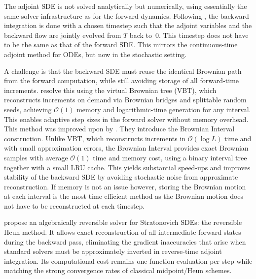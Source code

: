 The adjoint SDE is not solved analytically but numerically, using essentially the same solver infrastructure as for the
forward dynamics. Following \textcite{liScalableGradientsStochastic2020}, the backward integration is done with a chosen
timestep such that the adjoint variables and the backward flow are jointly evolved from $T$ back to~$0$. This timestep
does not have to be the same as that of the forward SDE. This mirrors the continuous-time adjoint method for ODEs, but
now in the stochastic setting.

A challenge is that the backward SDE must reuse the identical Brownian path from the forward computation, while
still avoiding storage of all forward-time increments. \textcite{liScalableGradientsStochastic2020} resolve this using
the virtual Brownian tree (VBT), which reconstructs increments on demand via Brownian bridges and splittable
random seeds, achieving $\mathcal{O}(1)$ memory and logarithmic-time generation for any interval. This enables adaptive
step sizes in the forward solver without memory overhead. This method was improved upon by
\textcite{kidgerEfficientAccurateGradients2021}. They introduce the Brownian Interval construction. Unlike VBT,
which reconstructs increments in $\mathcal{O}(\log L)$ time and with small approximation errors, the Brownian Interval
provides exact Brownian samples with average $\mathcal{O}(1)$ time and memory cost, using a binary interval tree together with a
small LRU cache. This yields substantial speed-ups and improves stability of the backward SDE by avoiding stochastic noise from approximate reconstruction. If memory is not an issue however, storing the Brownian motion at each interval is
the most time efficient method as the Brownian motion does not have to be reconstructed at each timestep.

\textcite{kidgerEfficientAccurateGradients2021} propose an algebraically reversible solver for Stratonovich SDEs: the
reversible Heun method. It allows exact reconstruction of all intermediate forward states during the backward pass,
eliminating the gradient inaccuracies that arise when standard solvers must be approximately inverted in reverse-time
adjoint integration. Its computational cost remains one function evaluation per step while matching the strong
convergence rates of classical midpoint/Heun schemes.

